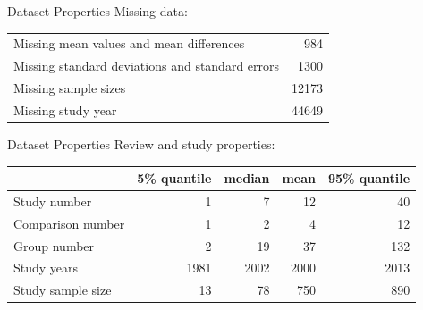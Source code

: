 \documentclass[english]{beamer}\usepackage[]{graphicx}\usepackage[]{color}
\begin{document}
\begin{frame}{Dataset Properties}
Missing data:
\begin{table}[ht]
\centering
\begin{tabular}{lr}
  \hline
  \hline
Missing mean values and mean differences & 984 \\ 
  Missing standard deviations and standard errors & 1300 \\ 
  Missing sample sizes & 12173 \\ 
  Missing study year & 44649 \\ 
   \hline
\end{tabular}
\end{table}

\end{frame}


\begin{frame}{Dataset Properties}
Review and study properties:
\begin{table}[ht]
\centering
\begingroup\footnotesize
\begin{tabular}{lrrrr}
  & 5\% quantile & median & mean & 95\% quantile \\ 
  \hline
Study number & 1 & 7 & 12 & 40 \\ 
   \hline
\hline
Comparison number & 1 & 2 & 4 & 12 \\ 
  Group number & 2 & 19 & 37 & 132 \\ 
  Study years & 1981 & 2002 & 2000 & 2013 \\ 
   \hline
Study sample size & 13 & 78 & 750 & 890 \\ 
  \end{tabular}
\endgroup
\end{table}

\end{frame}
\end{document}
